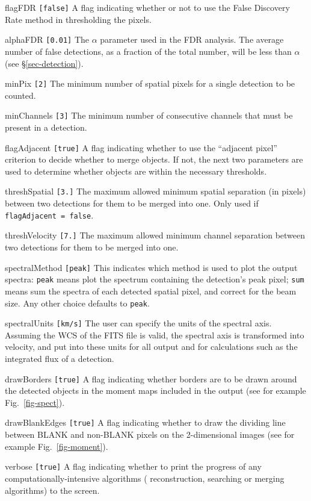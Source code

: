 \begin{entry}
\item[flagFDR \texttt{[false]}] A flag indicating whether or not to use
  the False Discovery Rate method in thresholding the pixels.
\item[alphaFDR \texttt{[0.01]}] The $\alpha$ parameter used in the FDR
analysis. The average number of false detections, as a fraction of the
total number, will be less than $\alpha$ (see \S\ref{sec-detection}).
\end{entry}

\begin{entry}
\item[minPix \texttt{[2]}] The minimum number of spatial pixels for a
  single detection to be counted.
\item[minChannels \texttt{[3]}] The minimum number of consecutive
  channels that must be present in a detection.
\item[flagAdjacent \texttt{[true]}] A flag indicating whether to use
  the ``adjacent pixel'' criterion to decide whether to merge
  objects. If not, the next two parameters are used to determine
  whether objects are within the necessary thresholds.
\item[threshSpatial \texttt{[3.]}] The maximum allowed minimum spatial
  separation (in pixels) between two detections for them to be merged
  into one. Only used if \texttt{flagAdjacent = false}.
\item[threshVelocity \texttt{[7.]}] The maximum allowed minimum channel
  separation between two detections for them to be merged into
  one. 
\end{entry}

\begin{entry}
\item[spectralMethod \texttt{[peak]}] This indicates which method is used
  to plot the output spectra: \texttt{peak} means plot the spectrum
  containing the detection's peak pixel; \texttt{sum} means sum the
  spectra of each detected spatial pixel, and correct for the beam
  size. Any other choice defaults to \texttt{peak}.
\item[spectralUnits \texttt{[km/s]}] The user can specify the units of
  the spectral axis. Assuming the WCS of the FITS file is valid, the
  spectral axis is transformed into velocity, and put into these units
  for all output and for calculations such as the integrated flux of a
  detection.
\item[drawBorders \texttt{[true]}] A flag indicating whether borders
  are to be drawn around the detected objects in the moment maps
  included in the output (see for example Fig.~\ref{fig-spect}).
\item[drawBlankEdges \texttt{[true]}] A flag indicating whether to
 draw the dividing line between BLANK and non-BLANK pixels on the
 2-dimensional images (see for example Fig.~\ref{fig-moment}).
\item[verbose \texttt{[true]}] A flag indicating whether to print the
  progress of any computationally-intensive algorithms (\eg
  reconstruction, searching or merging algorithms) to the screen.
\end{entry}

